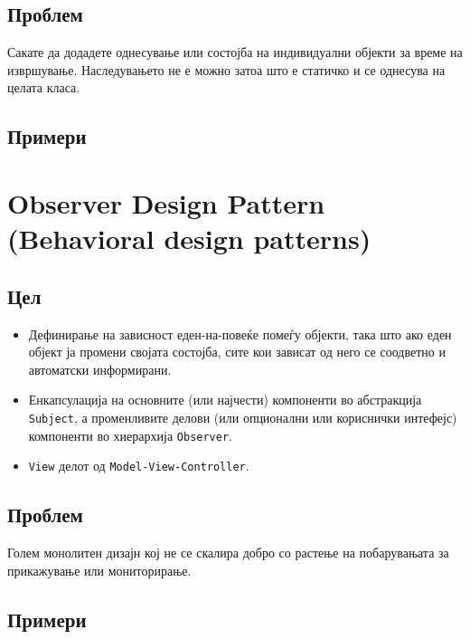 \subsection{Проблем}

Сакате да додадете однесување или состојба на индивидуални објекти за време на
извршување. Наследувањето не е можно затоа што е статичко и се однесува на
целата класа.

\subsection{Примери}










\section{Observer Design Pattern (Behavioral design patterns)}

\subsection{Цел}

\begin{itemize}
  \item Дефинирање на зависност еден-на-повеќе помеѓу објекти, така што ако еден
  објект ја промени својата состојба, сите кои зависат од него се соодветно и
  автоматски информирани.
  \item Енкапсулација на основните (или најчести) компоненти во абстракција
  \texttt{Subject}, а променливите делови (или опционални или кориснички
  интефејс) компоненти во хиерархија \texttt{Observer}.
  \item \texttt{View} делот од \texttt{Model-View-Controller}. 
\end{itemize}

\subsection{Проблем}
Голем монолитен дизајн кој не се скалира добро со растење на побарувањата за
прикажување или мониторирање.

\subsection{Примери}






